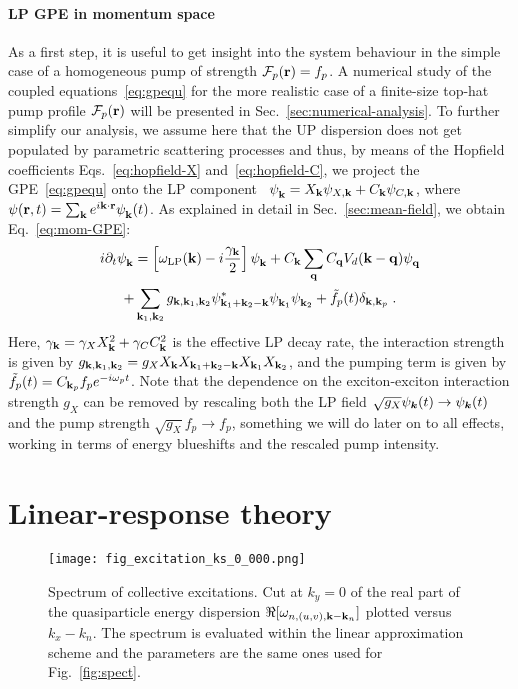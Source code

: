 \paragraph{LP GPE in momentum space}
As a first step, it is useful to get insight into the system behaviour
in the simple case of a homogeneous pump of strength
$\mathcal{F}_p(\mathbf{r}) = f_p$. A numerical study of the coupled
equations~\eqref{eq:gpequ} for the more realistic case of a
finite-size top-hat pump profile $\mathcal{F}_p(\mathbf{r})$ will be
presented in Sec.~\ref{sec:numerical-analysis}.
%
To further simplify our analysis, we assume here that the UP
dispersion does not get populated by parametric scattering processes
and thus, by means of the Hopfield coefficients
Eqs.~\eqref{eq:hopfield-X} and~\eqref{eq:hopfield-C}, we project the
GPE~\eqref{eq:gpequ} onto the LP
component~\cite{Ciuti_2001,Wouters_2007_b}
$\psi_{\mathbf{k}}^{} = X_{\mathbf{k}} \psi_{X,\mathbf{k}} + C_{\mathbf{k}}
\psi_{C,\mathbf{k}}$, where
$\psi(\mathbf{r},t) = \sum_{\mathbf{k}} e^{i\mathbf{k}\cdot \mathbf{r}}
\psi_{\mathbf{k}}^{} (t)$. As explained in detail in
Sec.~\ref{sec:mean-field}, we obtain Eq.~\eqref{eq:mom-GPE}:
%
\begin{multline}
  i\partial_t \psi_{\mathbf{k}}^{} = \left[\omega_{\text{LP}}({\mathbf{k}}) -
    i\frac{\gamma_{\mathbf{k}}}{2}\right]\psi_{\mathbf{k}}^{} +
  C_{\mathbf{k}} \sum_{\mathbf{q}} C_{\mathbf{q}} V_d(\mathbf{k} - \mathbf{q})
  \psi_{\mathbf{q}}^{}\\ + \sum_{\mathbf{k}_1, \mathbf{k}_2} g_{\mathbf{k},
    \mathbf{k}_1, \mathbf{k}_2} \psi^*_{\mathbf{k}_1 + \mathbf{k}_2-\mathbf{k}}
  \psi_{\mathbf{k}_1}^{} \psi_{\mathbf{k}_2}^{} + \tilde{f}_p(t)
  \delta_{\mathbf{k},\mathbf{k}_p}\; .
\label{eq:efflp}
\end{multline}
%
Here, $\gamma_{\mathbf{k}}=\gamma_X X_{\mathbf{k}}^2 + \gamma_C C_{\mathbf{k}}^2$
is the effective LP decay rate, the interaction strength is given by
$g_{\mathbf{k}, \mathbf{k}_1, \mathbf{k}_2}=g_X X_{\mathbf{k}} X_{\mathbf{k}_1 +
  \mathbf{k}_2-\mathbf{k}} X_{\mathbf{k}_1} X_{\mathbf{k}_2}$, and the pumping term is
given by $\tilde{f}_p(t)= C_{\mathbf{k}_p} f_p e^{-i\omega_p t}$. Note
that the dependence on the exciton-exciton interaction strength $g_X$
can be removed by rescaling both the LP field
$\sqrt{g_X}\psi_{\bm{k}}(t) \rightarrow \psi_{\bm{k}}(t)$ and the pump
strength $\sqrt{g_X}f_p \rightarrow f_p$, something we will do later
on to all effects, working in terms of energy blueshifts and the
rescaled pump intensity.


\section{Linear-response theory}
\label{sec:line-resp-theory}
%
\begin{figure}[tb]\centering
\texttt{[image: fig\_excitation\_ks\_0\_000.png]}
\caption{Spectrum of collective excitations. Cut at $k_y=0$ of the
  real part of the quasiparticle energy dispersion
  $\Re [\omega_{n,(u,v),\mathbf{k}-\mathbf{k}_n}]$ plotted versus $k_x -
  k_n$. The spectrum is evaluated within the linear approximation
  scheme and the parameters are the same ones used for
  Fig.~\ref{fig:spect}.}
\label{fig:bogol}
\end{figure}
%
